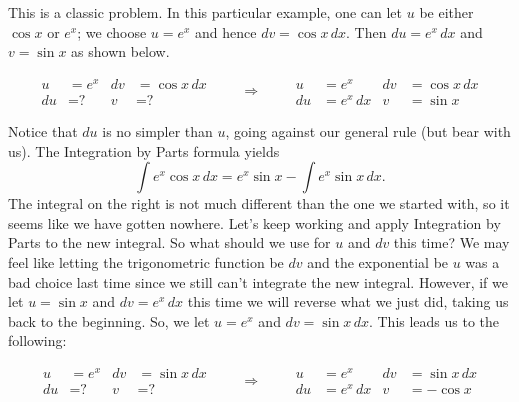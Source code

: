 {This is a classic problem.
In this particular example, one can let $u$ be either $\cos x$ or $e^x$;
we choose $u=e^x$ and hence $dv = \cos x\,dx$.  Then $du=e^x\,dx$ and $v=\sin x$ as shown below.

\begin{lxfigure}
\[
\begin{aligned}
u&= e^x & dv&=\cos x\, dx\\
du&= \text{?} & v&=\text{?}
\end{aligned}
\qquad\Rightarrow\qquad
\begin{aligned}
u&= e^x& dv&=\cos x\, dx\\
du&= e^x\, dx & v&=\sin x
\end{aligned}
\]
\label{fig:ibp4}
\end{lxfigure}

Notice that $du$ is no simpler than $u$, going against our general rule (but bear with us). The Integration by Parts formula yields
$$\int e^x\cos x\, dx = e^x\sin x - \int e^x\sin x\,dx.$$
The integral on the right is not much different than the one we started with, so it seems like we have gotten nowhere. Let's  keep working and apply Integration by Parts to the new integral. So what should we use for $u$ and $dv$ this time? We may feel like letting the trigonometric function be $dv$ and the exponential be $u$ was a bad choice last time since we still can't integrate the new integral. However, if we let $u=\sin x$ and $dv=e^x\,dx$ this time we will reverse what we just did, taking us back to the beginning. So, we let $u=e^x$ and $dv = \sin x\,dx$. This leads us to the following:

\begin{lxfigure}
\[
\begin{aligned}
u&= e^x & dv&=\sin x\, dx\\
du&= \text{?} & v&=\text{?}
\end{aligned}
\qquad\Rightarrow\qquad
\begin{aligned}
u&= e^x& dv&=\sin x\, dx\\
du&= e^x\, dx & v&=-\cos x
\end{aligned}
\]
\label{fig:ibp4a}
\end{lxfigure}

}

